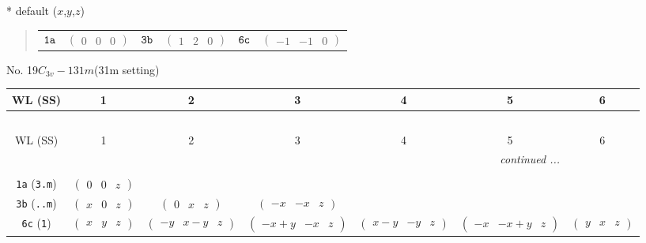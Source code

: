 \documentclass[fleqn,9pt,landscape]{jsarticle}
\begin{document}
* default ($x$,$y$,$z$)
\begin{quote}
\begin{tabular}{cccccc}
$ {\tt 1a} $ & $ \begin{pmatrix} 0 & 0 & 0 \end{pmatrix} $ & $ {\tt 3b} $ & $ \begin{pmatrix} 1 & 2 & 0 \end{pmatrix} $ & $ {\tt 6c} $ & $ \begin{pmatrix} -1 & -1 & 0 \end{pmatrix} $
\end{tabular}
\end{quote}
\newpage
No. 19\quad$C_{3v}-1$\quad$31m$\quad(31m setting)\quad[ trigonal ]
\begin{center}
\renewcommand{\arraystretch}{1.2}
\begin{longtable}{ccccccc}
 \hline \hline
WL (SS) & 1 & 2 & 3 & 4 & 5 & 6 \\ \hline \endfirsthead

\multicolumn{6}{l}{\tablename\ \thetable{}} \\
 \hline \hline
WL (SS) & 1 & 2 & 3 & 4 & 5 & 6 \\ \hline \endhead

 \hline \hline
\multicolumn{6}{r}{\footnotesize\it continued ...} \\ \endfoot

 \hline \hline
\multicolumn{6}{r}{} \\ \endlastfoot

{\tt 1a} ({\tt 3.m}) & $ \begin{pmatrix} 0 & 0 & z \end{pmatrix} $ & $  $ & $  $ & $  $ & $  $ & $  $ \\ \hline
{\tt 3b} ({\tt ..m}) & $ \begin{pmatrix} x & 0 & z \end{pmatrix} $ & $ \begin{pmatrix} 0 & x & z \end{pmatrix} $ & $ \begin{pmatrix} - x & - x & z \end{pmatrix} $ & $  $ & $  $ & $  $ \\ \hline
{\tt 6c} ({\tt 1}) & $ \begin{pmatrix} x & y & z \end{pmatrix} $ & $ \begin{pmatrix} - y & x - y & z \end{pmatrix} $ & $ \begin{pmatrix} - x + y & - x & z \end{pmatrix} $ & $ \begin{pmatrix} x - y & - y & z \end{pmatrix} $ & $ \begin{pmatrix} - x & - x + y & z \end{pmatrix} $ & $ \begin{pmatrix} y & x & z \end{pmatrix} $ \\
\end{longtable}
\end{center}
\end{document}
